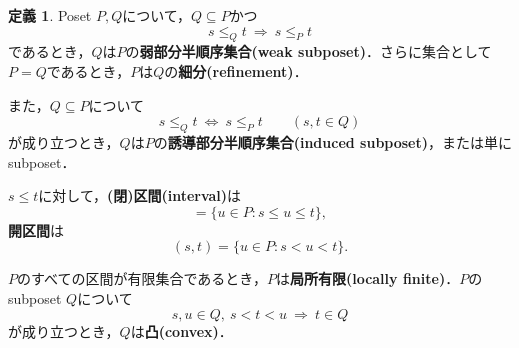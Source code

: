 \documentclass[xelatex,ja=standard,a4paper,14pt,everyparhook=compat]{bxjsarticle}
\theoremstyle{definition}
\newtheorem*{definition*}{定義}
\begin{document}
\begin{definition*}
    Poset $P,Q$について，$Q \subseteq P$かつ \begin{equation*}
        s \leq_Q t \ \Longrightarrow \ s \leq_P t
    \end{equation*}
    であるとき，$Q$は$P$の\textbf{弱部分半順序集合(weak subposet)}．さらに集合として$P=Q$であるとき，$P$は$Q$の\textbf{細分(refinement)}．

    また，$Q \subseteq P$について \begin{equation*}
        s \leq_Q t \ \Longleftrightarrow \ s \leq_P t \qquad (s,t \in Q)
    \end{equation*}
    が成り立つとき，$Q$は$P$の\textbf{誘導部分半順序集合(induced subposet)}，または単にsubposet．

    $s \leq t$に対して，\textbf{(閉)区間(interval)}は \begin{equation*}
        [s,t] = \{u \in P : s \leq u \leq t\},
    \end{equation*}
    \textbf{開区間}は \begin{equation*}
        (s,t) = \{u \in P : s < u < t\}.
    \end{equation*}

    $P$のすべての区間が有限集合であるとき，$P$は\textbf{局所有限(locally finite)}．$P$のsubposet $Q$について \begin{equation*}
        s,u \in Q, \ s < t < u \ \Longrightarrow \ t \in Q
    \end{equation*}
    が成り立つとき，$Q$は\textbf{凸(convex)}．
\end{definition*}

\newpage
\end{document}
